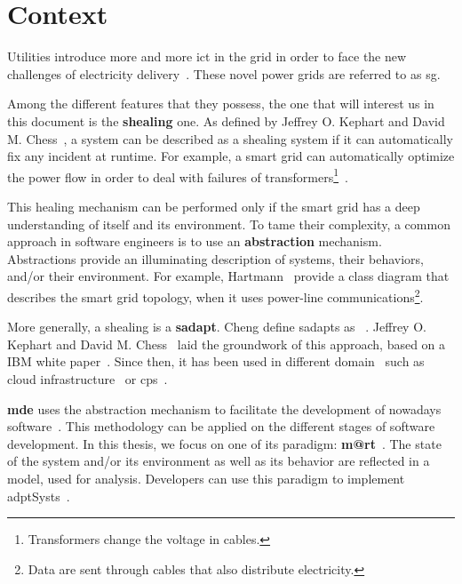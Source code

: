 \section{Context}
Utilities introduce more and more \gls{ict} in the grid in order to face the new challenges of electricity delivery~\cite{farhangi2010path, ipakchi2009grid, DBLP:journals/comsur/FangMXY12}.
These novel power grids are referred to as \gls{sg}.

Among the different features that they possess, the one that will interest us in this document is the \textbf{\gls{shealing}} one.
As defined by Jeffrey O. Kephart and David M. Chess~\cite{DBLP:journals/computer/KephartC03}, a system can be described as a \gls{shealing} system if it can automatically fix any incident at runtime.
For example, a smart grid can automatically optimize the power flow in order to deal with failures of transformers\footnote{Transformers change the voltage in cables.}~\cite{DBLP:journals/comsur/FangMXY12}.

This healing mechanism can be performed only if the smart grid has a deep understanding of itself and its environment.
To tame their complexity, a common approach in software engineers is to use an \textbf{abstraction} mechanism.
Abstractions provide an illuminating description of systems, their behaviors, and/or their environment.
For example, Hartmann~\etal \cite{DBLP:conf/smartgridcomm/0001FKTPTR14} provide a class diagram that describes the smart grid topology, when it uses power-line communications\footnote{Data are sent through cables that also distribute electricity.}.

\bigskip

More generally, a \gls{shealing} is a \textbf{\gls{sadapt}}. 
Cheng \etal define \glspl{sadapt} as ~\cite{DBLP:conf/dagstuhl/ChengLGIMABBBCSDFGGGKKKLMMMPSTTWW09}.
Jeffrey O. Kephart and David M. Chess~\cite{DBLP:journals/computer/KephartC03} laid the groundwork of this approach, based on a IBM white paper~\cite{computing2006architectural}.
Since then, it has been used in different domain~\cite{DBLP:journals/corr/abs-1904-01518} such as cloud infrastructure~\cite{DBLP:conf/icac/JavadiG17, OpenStack:Watcher:Wiki, DBLP:conf/icse/BarnaKFL17} or \gls{cps}~\cite{DBLP:conf/icac/LalandaGC17, DBLP:conf/cbse/FouquetMFBPJ12, DBLP:conf/smartgridsec/0001FKNT14}.

\textbf{\Gls{mde}} uses the abstraction mechanism to facilitate the development of nowadays software~\cite{DBLP:journals/computer/Schmidt06, DBLP:conf/ifm/Kent02, DBLP:series/synthesis/2017Brambilla}.
This methodology can be applied on the different stages of software development.
In this thesis, we focus on one of its paradigm: \textbf{\gls{m@rt}}~\cite{DBLP:journals/computer/BlairBF09, DBLP:journals/computer/MorinBJFS09}.
The state of the system and/or its environment as well as its behavior are reflected in a model, used for analysis.
Developers can use this paradigm to implement \glspl{adptSyst}~\cite{DBLP:journals/computer/MorinBJFS09, DBLP:conf/smartgridsec/0001FKNT14}.

